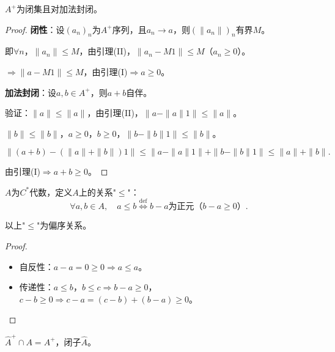 \documentclass[lang=cn,a4paper,newtx,section]{elegantbook}
\begin{document}
\begin{theorem}
  $A^+$为闭集且对加法封闭。
\end{theorem}

\begin{proof}
  \textbf{闭性}：设$(a_n)_n$为$A^+$序列，且$a_n \to a$，则$(\|a_n\|)_n$有界$M$。
  
  即$\forall n$，$\|a_n\| \leq M$，由引理(II)，$\|a_n - M1\| \leq M$（$a_n \geq 0$）。
  
  $\Rightarrow \|a - M1\| \leq M$，由引理(I)$\Rightarrow a \geq 0$。
  
  \textbf{加法封闭}：设$a, b \in A^+$，则$a + b$自伴。
  
  验证：$\|a\| \leq \|a\|$，由引理(II)，$\|a - \|a\|1\| \leq \|a\|$。
  
  $\|b\| \leq \|b\|$，$a \geq 0$，$b \geq 0$，$\|b - \|b\|1\| \leq \|b\|$。
  
  \begin{equation*}
    \|(a + b) - (\|a\| + \|b\|)1\| \leq \|a - \|a\|1\| + \|b - \|b\|1\| \leq \|a\| + \|b\|.
  \end{equation*}
  
  由引理(I)$\Rightarrow a + b \geq 0$。
\end{proof}

\begin{definition}[偏序关系]
  $A$为$C^*$代数，定义$A$上的关系"$\leq$"：
  \begin{equation*}
    \forall a, b \in A, \quad a \leq b \stackrel{\mathrm{def}}{\Longleftrightarrow} b - a\text{为正元}（b - a \geq 0）.
  \end{equation*}
\end{definition}

\begin{proposition}
  以上"$\leq$"为偏序关系。
\end{proposition}

\begin{proof}
  \begin{itemize}
    \item 自反性：$a - a = 0 \geq 0 \Rightarrow a \leq a$。
    \item 传递性：$a \leq b$，$b \leq c \Rightarrow b - a \geq 0$，$c - b \geq 0 \Rightarrow c - a = (c - b) + (b - a) \geq 0$。
  \end{itemize}
\end{proof}

\begin{remark}
  $\hat{A}^+ \cap A = A^+$，闭子$\hat{A}$。
\end{remark}
\end{document}
